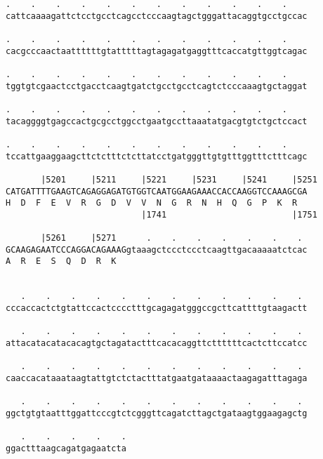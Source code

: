 \documentclass{article}
\begin{document}
\begin{Verbatim}
.    .    .    .    .    .    .    .    .    .    .    .    
cattcaaaagattctcctgcctcagcctcccaagtagctgggattacaggtgcctgccac
                                                            
.    .    .    .    .    .    .    .    .    .    .    .    
cacgcccaactaattttttgtatttttagtagagatgaggtttcaccatgttggtcagac
                                                            
.    .    .    .    .    .    .    .    .    .    .    .    
tggtgtcgaactcctgacctcaagtgatctgcctgcctcagtctcccaaagtgctaggat
                                                            
.    .    .    .    .    .    .    .    .    .    .    .    
tacaggggtgagccactgcgcctggcctgaatgccttaaatatgacgtgtctgctccact
                                                            
.    .    .    .    .    .    .    .    .    .    .    .    
tccattgaaggaagcttctctttctcttatcctgatgggttgtgtttggtttctttcagc
                                                            
       |5201     |5211     |5221     |5231     |5241     |5251
CATGATTTTGAAGTCAGAGGAGATGTGGTCAATGGAAGAAACCACCAAGGTCCAAAGCGA
H  D  F  E  V  R  G  D  V  V  N  G  R  N  H  Q  G  P  K  R  
                           |1741                         |1751
  
       |5261     |5271      .    .    .    .    .    .    . 
GCAAGAGAATCCCAGGACAGAAAGgtaaagctccctccctcaagttgacaaaaatctcac
A  R  E  S  Q  D  R  K                                      
                                                            
  
   .    .    .    .    .    .    .    .    .    .    .    . 
cccaccactctgtattccactcccctttgcagagatgggccgcttcattttgtaagactt
                                                            
   .    .    .    .    .    .    .    .    .    .    .    . 
attacatacatacacagtgctagatactttcacacaggttcttttttcactcttccatcc
                                                            
   .    .    .    .    .    .    .    .    .    .    .    . 
caaccacataaataagtattgtctctactttatgaatgataaaactaagagatttagaga
                                                            
   .    .    .    .    .    .    .    .    .    .    .    . 
ggctgtgtaatttggattcccgtctcgggttcagatcttagctgataagtggaagagctg
                                                            
   .    .    .    .    .
ggactttaagcagatgagaatcta
                        

\end{Verbatim}
\end{document}
